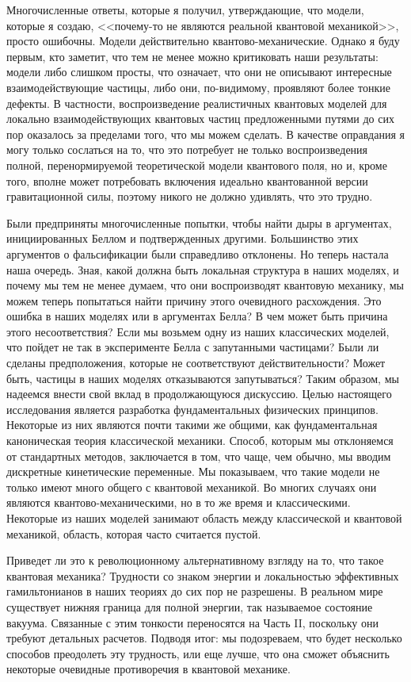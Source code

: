 \documentclass[main.tex]{subfiles}
\begin{document}
Многочисленные ответы, которые я получил, утверждающие, что модели, которые я создаю, <<почему-то не являются реальной квантовой механикой>>, просто ошибочны. Модели действительно квантово-механические. Однако я буду первым, кто заметит, что тем не менее можно критиковать наши результаты: модели либо слишком просты, что означает, что они не описывают интересные взаимодействующие частицы, либо они, по-видимому, проявляют более тонкие дефекты. В частности, воспроизведение реалистичных квантовых моделей для локально взаимодействующих квантовых частиц предложенными путями до сих пор оказалось за пределами того, что мы можем сделать. В качестве оправдания я могу только сослаться на то, что это потребует не только воспроизведения полной, перенормируемой теоретической модели квантового поля, но и, кроме того, вполне может потребовать включения идеально квантованной версии гравитационной силы, поэтому никого не должно удивлять, что это трудно.

Были предприняты многочисленные попытки, чтобы найти дыры в аргументах, инициированных Беллом и подтвержденных другими. Большинство этих аргументов о фальсификации были справедливо отклонены. Но теперь настала наша очередь. Зная, какой должна быть локальная структура в наших моделях, и почему мы тем не менее думаем, что они воспроизводят квантовую механику, мы можем теперь попытаться найти причину этого очевидного расхождения. Это ошибка в наших моделях или в аргументах Белла? В чем может быть причина этого несоответствия? Если мы возьмем одну из наших классических моделей, что пойдет не так в эксперименте Белла с запутанными частицами? Были ли сделаны предположения, которые не соответствуют действительности? Может быть, частицы в наших моделях отказываются запутываться? 
Таким образом, мы надеемся внести свой вклад в продолжающуюся дискуссию. Целью настоящего исследования является разработка фундаментальных физических принципов. Некоторые из них являются почти такими же общими, как фундаментальная каноническая теория классической механики. Способ, которым мы отклоняемся от стандартных методов, заключается в том, что чаще, чем обычно, мы вводим дискретные кинетические переменные. Мы показываем, что такие модели не только имеют много общего с квантовой механикой. Во многих случаях они являются квантово-механическими, но в то же время и классическими. Некоторые из наших моделей занимают область между классической и квантовой механикой, область, которая часто считается пустой. 

Приведет ли это к революционному альтернативному взгляду на то, что такое квантовая механика? Трудности со знаком энергии и локальностью эффективных гамильтонианов в наших теориях до сих пор не разрешены. В реальном мире существует нижняя граница для полной энергии, так называемое состояние вакуума. Связанные с этим тонкости переносятся на Часть II, поскольку они требуют детальных расчетов. Подводя итог: мы подозреваем, что будет несколько способов преодолеть эту трудность, или еще лучше, что она сможет объяснить некоторые очевидные противоречия в квантовой механике. 
\end{document}
